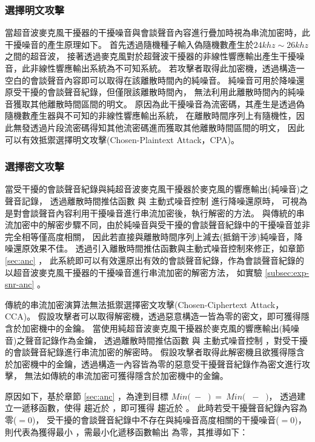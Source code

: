 \subsubsection{選擇明文攻擊}

    當超音波麥克風干擾器的干擾噪音與會談聲音內容進行疊加時視為串流加密時，此干擾噪音的產生原理如下。
首先透過隨機種子輸入偽隨機數產生於$24khz\sim26khz$之間的超音波，
接著透過麥克風對於超聲波干擾器的非線性響應輸出產生干擾噪音，此非線性響應輸出系統為不可知系統。
若攻擊者取得此加密機，透過構造一空白的會談聲音內容即可以取得在該離散時間內的純噪音。
純噪音可用於降噪還原受干擾的會談聲音紀錄，但僅限該離散時間內，
無法利用此離散時間內的純噪音獲取其他離散時間區間的明文。
原因為此干擾噪音為流密碼，其產生是透過偽隨機數產生器與不可知的非線性響應輸出系統，
在離散時間序列上有隨機性，因此無發透過片段流密碼得知其他流密碼進而獲取其他離散時間區間的明文，
因此可以有效抵禦選擇明文攻擊(Chosen-Plaintext Attack，CPA)。


\subsubsection{選擇密文攻擊}

    當受干擾的會談聲音紀錄與純超音波麥克風干擾器於麥克風的響應輸出(純噪音)之聲音記錄，
透過離散時間推估函數 \DEFfuncEstm{} 與 主動式噪音控制 \DEFfuncAnc{} 進行降噪還原時，
可視為是對會談聲音內容利用干擾噪音進行串流加密後，執行解密的方法。
與傳統的串流加密中的解密步驟不同，由於純噪音與受干擾的會談聲音紀錄中的干擾噪音並非完全相等僅高度相關，
因此若直接與離散時間序列上減去(抵銷干涉)純噪音，降噪還原效果不佳。
透過引入離散時間推估函數與主動式噪音控制來修正，如章節 \ref{sec:anc} ，
此系統即可以有效還原出有效的會談聲音紀錄，作為會談聲音紀錄的以超音波麥克風干擾器的干擾噪音進行串流加密的解密方法，
如實驗 \ref{subsec:exp-snr-anc} 。

    傳統的串流加密演算法無法抵禦選擇密文攻擊(Chosen-Ciphertext Attack，CCA)。
假設攻擊者可以取得解密機，透過惡意構造一皆為零的密文，即可獲得隱含於加密機中的金鑰。
當使用純超音波麥克風干擾器於麥克風的響應輸出(純噪音)之聲音記錄作為金鑰，
透過離散時間推估函數 \DEFfuncEstm{} 與 主動式噪音控制 \DEFfuncAnc{}，對受干擾的會談聲音紀錄進行串流加密的解密時。
假設攻擊者取得此解密機且欲獲得隱含於加密機中的金鑰，透過構造一內容皆為零的惡意受干擾聲音紀錄作為密文進行攻擊，
無法如傳統的串流加密可獲得隱含於加密機中的金鑰。

    原因如下，基於章節 \ref{sec:anc} ，為達到目標
$Min($\DEFmicRecREV $~-~$ \DEFmicConv $)~=~Min($ \DEFmicUSJ $~-~$ \DEFmicUSD $)$，
透過建立一遞移函數，使得 \DEFmicUSD 趨近於 \DEFmicUSJ，即可獲得 \DEFmicRecREV 趨近於 \DEFmicConv。
此時若受干擾聲音紀錄內容為零(\DEFmicRecJ $= 0$)，
受干擾的會談聲音紀錄中不存在與純噪音高度相關的干擾噪音(\DEFmicUSJ $= 0$)，
則代表為獲得最小 \DEFmicRecREV，需最小化遞移函數輸出 \DEFmicUSD 為零，其推導如下：

